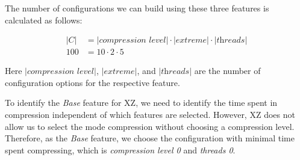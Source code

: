 
The number of configurations we can build using these three features is calculated as follows:

\begin{align}
    \lvert C \rvert &= \lvert \textit{compression level} \rvert \cdot \lvert \textit{extreme} \rvert \cdot \lvert \textit{threads} \rvert \\
    100 &= 10 \cdot 2 \cdot 5 \nonumber
\end{align}

Here $\lvert \textit{compression level} \rvert$, $\lvert \textit{extreme} \rvert$, and $\lvert \textit{threads} \rvert$ are the number of 
configuration options for the respective feature.

To identify the \emph{Base} feature for \textsc{XZ}, we need to identify the time spent in compression independent of which features are selected. 
However, \textsc{XZ} does not allow us to select the mode compression without choosing a compression level. 
Therefore, as the \emph{Base} feature, we choose the configuration with minimal time spent compressing, 
which is \emph{compression level 0} and \emph{threads 0}.